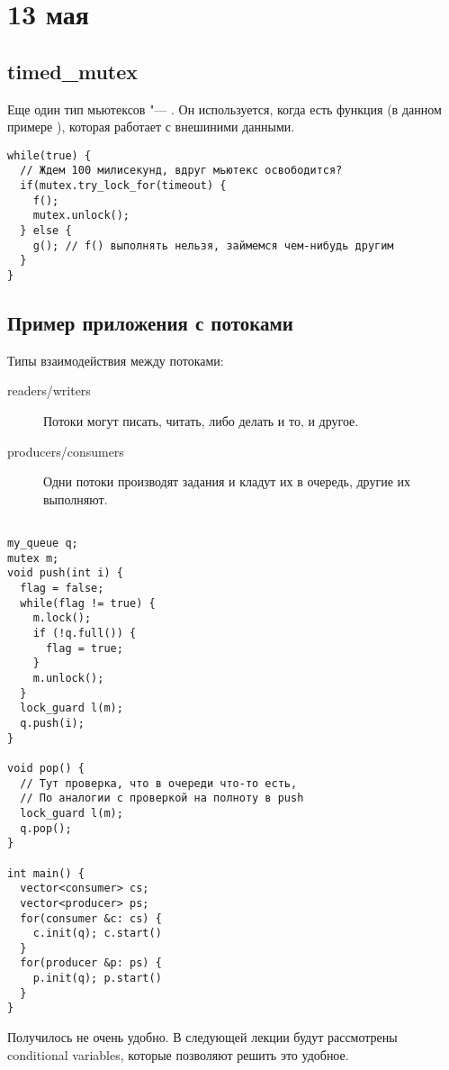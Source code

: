 \section{13 мая}
\subsection{timed\_mutex}
Еще один тип мьютексов "--- . Он используется, когда есть функция (в данном примере ), которая работает с внешиними данными.
\begin{verbatim}
while(true) {
  // Ждем 100 милисекунд, вдруг мьютекс освободится?
  if(mutex.try_lock_for(timeout) {
    f();
    mutex.unlock();
  } else {
    g(); // f() выполнять нельзя, займемся чем-нибудь другим
  } 
}
\end{verbatim}

\subsection{Пример приложения с потоками}
Типы взаимодействия между потоками:
\begin{description}
  \item[readers/writers] Потоки могут писать, читать, либо делать и то, и другое.
  \item[producers/consumers] Одни потоки производят задания и кладут их в очередь, другие их выполняют.
\end{description}

\begin{verbatim}

my_queue q;
mutex m;
void push(int i) {
  flag = false;
  while(flag != true) {
    m.lock();
    if (!q.full()) {
      flag = true;
    }
    m.unlock();
  }
  lock_guard l(m);
  q.push(i);
}

void pop() {
  // Тут проверка, что в очереди что-то есть,
  // По аналогии с проверкой на полноту в push
  lock_guard l(m);
  q.pop();
}

int main() {
  vector<consumer> cs;
  vector<producer> ps;
  for(consumer &c: cs) {
    c.init(q); c.start()
  }
  for(producer &p: ps) {
    p.init(q); p.start()
  }
}
\end{verbatim}

Получилось не очень удобно. В следующей лекции будут рассмотрены conditional variables, которые позволяют решить это удобное.
